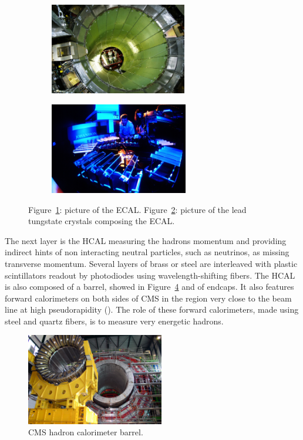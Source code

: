 	\begin{figure}[H]
		\begin{subfigure}{0.5\linewidth}
			\centering
			\includegraphics[height = 4cm]{fig/chapt2/ECAL_barrel.jpg}
			\caption{\label{fig:ECAL:A}}
		\end{subfigure}
		\begin{subfigure}{0.5\linewidth}
			\centering
			\includegraphics[height = 4cm]{fig/chapt2/ECAL_crystals.jpg}
			\caption{\label{fig:ECAL:B}}
		\end{subfigure}
		\caption{\label{fig:ECAL} Figure~\ref{fig:ECAL:A}: picture of the ECAL. Figure~\ref{fig:ECAL:B}: picture of the lead tungstate crystals composing the ECAL.}
	\end{figure}
	
	The next layer is the HCAL measuring the hadrons momentum and providing indirect hints of non interacting neutral particles, such as neutrinos, as missing transverse momentum. Several layers of brass or steel are interleaved with plastic scintillators readout by photodiodes using wavelength-shifting fibers. The HCAL is also composed of a barrel, showed in Figure~\ref{fig:HCAL} and of endcaps. It also features forward calorimeters on both sides of CMS in the region very close to the beam line at high pseudorapidity (). The role of these forward calorimeters, made using steel and quartz fibers, is to measure very energetic hadrons.
	
	\begin{figure}[H]
		\centering
		\includegraphics[height = 4cm]{fig/chapt2/HCAL.jpg}
		\caption{\label{fig:HCAL} CMS hadron calorimeter barrel.}
	\end{figure}
	
